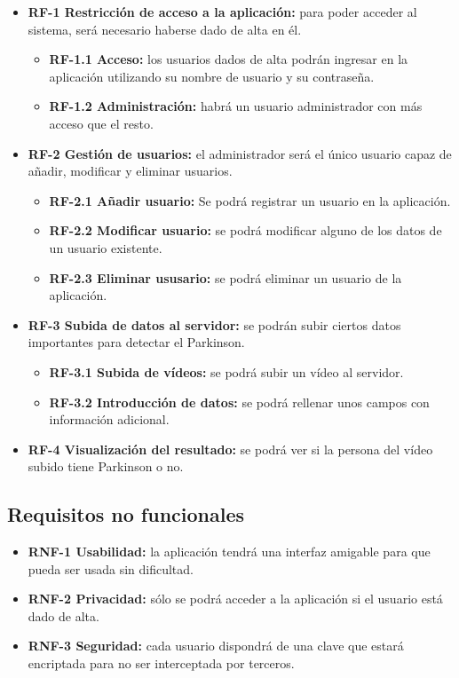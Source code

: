 \begin{itemize}
	\item \textbf{RF-1 Restricción de acceso a la aplicación:} para poder acceder al sistema, será necesario haberse dado de alta en él.
	\begin{itemize}
		\item \textbf{RF-1.1 Acceso:} los usuarios dados de alta podrán ingresar en la aplicación utilizando su nombre de usuario y su contraseña.
		\item \textbf{RF-1.2 Administración:} habrá un usuario administrador con más acceso que el resto.
	\end{itemize}
	\item \textbf{RF-2 Gestión de usuarios:} el administrador será el único usuario capaz de añadir, modificar y eliminar usuarios.
	\begin{itemize}
		\item \textbf{RF-2.1 Añadir usuario:} Se podrá registrar un usuario en la aplicación.
		\item \textbf{RF-2.2 Modificar usuario:} se podrá modificar alguno de los datos de un usuario existente.
		\item \textbf{RF-2.3 Eliminar ususario:} se podrá eliminar un usuario de la aplicación.
	\end{itemize}
	\item \textbf{RF-3 Subida de datos al servidor:} se podrán subir ciertos datos importantes para detectar el Parkinson.
	\begin{itemize}
		\item \textbf{RF-3.1 Subida de vídeos:} se podrá subir un vídeo al servidor.
		\item \textbf{RF-3.2 Introducción de datos:} se podrá rellenar unos campos con información adicional.
	\end{itemize}
	\item \textbf{RF-4 Visualización del resultado:} se podrá ver si la persona del vídeo subido tiene Parkinson o no.
\end{itemize}

\subsection{Requisitos no funcionales}
\begin{itemize}
	\item \textbf{RNF-1 Usabilidad:} la aplicación tendrá una interfaz amigable para que pueda ser usada sin dificultad.
	\item \textbf{RNF-2 Privacidad:} sólo se podrá acceder a la aplicación si el usuario está dado de alta.
	\item \textbf{RNF-3 Seguridad:} cada usuario dispondrá de una clave que estará encriptada para no ser interceptada por terceros.
	
	
\end{itemize}

